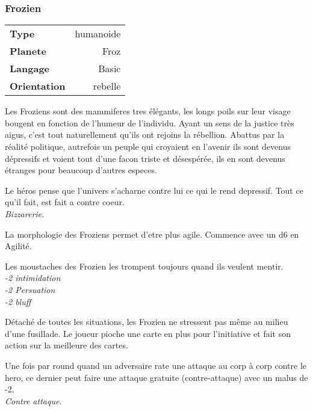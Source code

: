 \subsubsection{Frozien}

\begin{flushright}
	\begin{tabular}{|l|r|}
		\textbf{Type} & humanoide \\
		\textbf{Planete} & Froz \\
		\textbf{Langage} & Basic \\
		\textbf{Orientation} & rebelle\\
		\end{tabular}
	\end{flushright}

Les Froziens sont des mammiferes tres élégants, les longs poils sur leur visage bougent en fonction de l'humeur de l'individu. 
Ayant un sens de la justice très aigus, c'est tout naturellement qu'ils ont rejoins la rébellion. 
Abattus par la réalité politique, autrefois un peuple qui croyaient en l'avenir ils sont devenus dépressifs et voient tout 
d'une facon triste et désespérée, ils en sont devenus étranges pour beaucoup d'autres especes. \\

\begin{description}[align=left]

	\item[Bizzarerie :]  %
		Le héros pense que l'univers s'acharne contre lui ce qui le rend depressif. Tout ce qu'il fait, est fait a contre coeur. \\
		\textit{Bizzarerie.}\\
	
	\item[Gazelles :]      %
		La morphologie des Froziens permet d'etre plus agile. Commence avec un d6 en Agilité.\\
	
	\item[Un livre ouvert :] %
  	 	 Les moustaches des Frozien les trompent toujours quand ils veulent mentir.\\
  	 	 \textit{-2 intimidation\\
  	 	 -2 Persuation\\
  	  	-2 bluff
  	 	 }\\
    	
	\item[Tête froide] %
		Détaché de toutes les situations, les Frozien ne stressent pas même au milieu d'une fusillade. 
		Le joueur pioche une carte en plus pour l'initiative et fait son action sur la meilleure des cartes.\\

	\item[Instinct animal :] %
		Une fois par round quand un adversaire rate une attaque au corp à corp contre le hero, ce dernier peut faire 
		une attaque gratuite (contre-attaque) avec un malus de -2.\\
		\textit{Contre attaque.}



\end{description}
